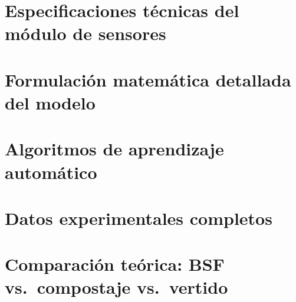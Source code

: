 \documentclass[10pt,spanish,fleqn,openany,twoside,letterpaper]{book}
\begin{document}
\chapter{Especificaciones técnicas del módulo de sensores}

\chapter{Formulación matemática detallada del modelo}

\chapter{Algoritmos de aprendizaje automático}

\chapter{Datos experimentales completos}

\chapter{Comparación teórica: BSF vs.\ compostaje vs.\ vertido}


\setlength{\parskip}{0.5em} 
\pagestyle{plain}
\renewcommand{\bibfont}{\scriptsize}
\printbibliography
\end{document}
